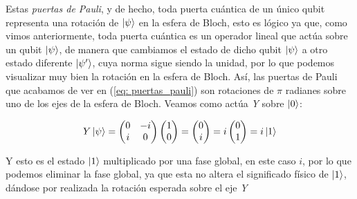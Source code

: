 \documentclass[12pt]{article}
\numberwithin{equation}{section} %
\begin{document}
    \vspace{2.5mm}

    Estas \textit{puertas de Pauli}, y de hecho, toda puerta cuántica de un único qubit representa una rotación de \( \ket{\psi} \) en la esfera de Bloch, esto es lógico ya que, como vimos anteriormente, toda puerta cuántica es un operador lineal que actúa sobre un qubit \( \ket{\psi} \), de manera que cambiamos el estado de dicho qubit \( \ket{\psi} \) a otro estado diferente \( \ket{\psi'} \), cuya norma sigue siendo la unidad, por lo que podemos visualizar muy bien la rotación en la esfera de Bloch. Así, las puertas de Pauli que acabamos de ver en (\ref{eq: puertas_pauli}) son rotaciones de \( \pi \) radianes sobre uno de los ejes de la esfera de Bloch. Veamos como actúa \textit{Y} sobre \( \ket{0} \):

    \begin{equation*}
        Y \ket{\psi} = \begin{pmatrix}
            0 & -i \\
            i & 0
        \end{pmatrix} \begin{pmatrix}
            1 \\
            0
        \end{pmatrix} = \begin{pmatrix}
            0 \\
            i
        \end{pmatrix} = i \begin{pmatrix}
            0 \\
            1
        \end{pmatrix} = i \ket{1}
    \end{equation*}

    \vspace{2.5mm}

    Y esto es el estado \( \ket{1} \) multiplicado por una fase global, en este caso \( i \), por lo que podemos eliminar la fase global, ya que esta no altera el significado físico de \( \ket{1} \), dándose por realizada la rotación esperada sobre el eje \textit{Y}

    \vspace{5mm}
\end{document}
